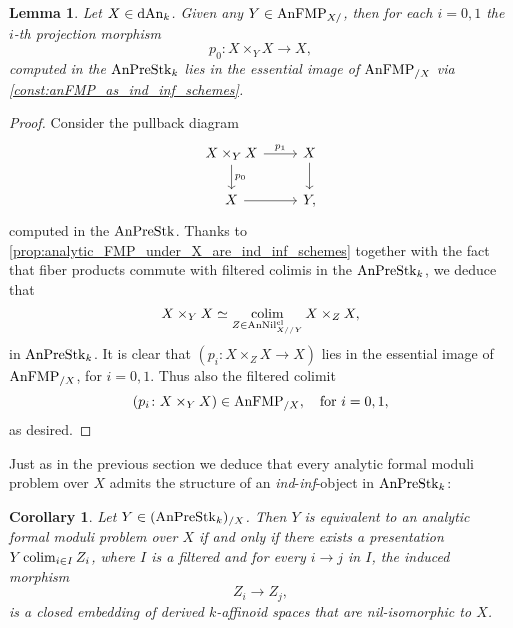 \documentclass[10pt,a4paper,reqno]{amsart} %
\theoremstyle{plain}
\newtheorem{lem}[thm]{Lemma}
\newtheorem{cor}[thm]{Corollary}
\theoremstyle{definition}
\theoremstyle{remark}
\numberwithin{equation}{section}
\begin{document}
\begin{lem} \label{formal_moduli_under_induce_formal_moduli_over_via_base_change}
    Let $X \in \mathrm{dAn}_k$. Given any $Y \in \mathrm{AnFMP}_{X/ }$, then for each $i= 0, 1$ the $i$-th projection morphism
        \[
            p_0 \colon X \times_Y X \to X,  
        \]
    computed in the \infcat $\mathrm{AnPreStk}_k$ lies in the essential image of $\mathrm{AnFMP}_{/X}$ via \cref{const:anFMP_as_ind_inf_schemes}.
\end{lem}


\begin{proof}
    Consider the pullback diagram
        \[
        \begin{tikzcd}
            X \times_Y X \ar{r}{p_1} \ar{d}{p_0} & X \ar{d} \\
            X \ar{r} & Y ,
        \end{tikzcd}
        \]
    computed in the \infcat $\mathrm{AnPreStk}$. Thanks to \cref{prop:analytic_FMP_under_X_are_ind_inf_schemes} together with the fact that fiber products commute with filtered colimis in the \infcat $\mathrm{AnPreStk}_k$,
    we deduce that
        \[
            X \times_Y X \simeq \operatorname*{colim}_{Z \in \mathrm{AnNil}^{\mathrm{cl}}_{X//Y}} X \times_Z X, 
        \]
    in $\mathrm{AnPreStk}_k$. It is clear that $(p_i \colon X \times_Z X \to X)$ lies in the essential image of $ \mathrm{AnFMP}_{/X}$, for $i = 0, 1$. Thus also the filtered colimit
        \[
            (p_i \colon X \times_Y X ) \in \mathrm{AnFMP}_{/X}, \quad \mathrm{for \ } i = 0, 1,
        \]  
    as desired.
\end{proof}


Just as in the previous section we deduce that every analytic formal moduli problem over $X$ admits the structure of an \emph{ind}-\emph{inf}-object
in $\mathrm{AnPreStk}_k$:

\begin{cor} \label{cor:formal_moduli_problems_over_X_are_ind_inf_objects}
    Let $Y \in (\mathrm{AnPreStk}_k)_{/X}$. Then $Y$ is equivalent to an analytic formal moduli problem over $X$ if and only if there exists
    a presentation $Y \operatorname*{colim}_{i \in I} Z_i$, where $I$ is a filtered \infcat and for every $i \to j$ in $I$, the induced morphism
        \[
          Z_i \to Z_j,  
        \]
    is a closed embedding of derived $k$-affinoid spaces that are nil-isomorphic to $X$.
\end{cor}
\end{document}

